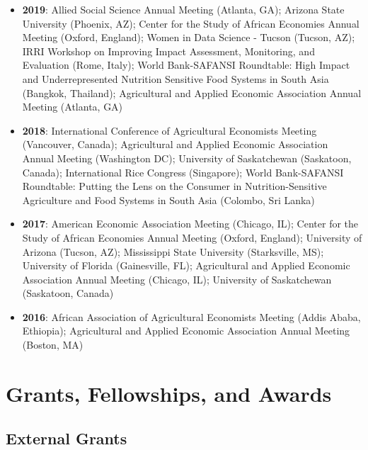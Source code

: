 \documentclass[letterpaper]{article}
\begin{document}
\begin{itemize}
\item \textbf{2019}: Allied Social Science Annual Meeting (Atlanta, GA); Arizona State University (Phoenix, AZ); Center for the Study of African Economies Annual Meeting (Oxford, England); Women in Data Science - Tucson (Tucson, AZ); IRRI Workshop on Improving Impact Assessment, Monitoring, and Evaluation (Rome, Italy); World Bank-SAFANSI Roundtable: High Impact and Underrepresented Nutrition Sensitive Food Systems in South Asia (Bangkok, Thailand); Agricultural and Applied Economic Association Annual Meeting (Atlanta, GA)

\item \textbf{2018}: International Conference of Agricultural Economists Meeting (Vancouver, Canada); Agricultural and Applied Economic Association Annual Meeting (Washington DC); University of Saskatchewan (Saskatoon, Canada); International Rice Congress (Singapore); World Bank-SAFANSI Roundtable: Putting the Lens on the Consumer in Nutrition-Sensitive Agriculture and Food Systems in South Asia (Colombo, Sri Lanka)
	
\item \textbf{2017}: American Economic Association Meeting (Chicago, IL); Center for the Study of African Economies Annual Meeting (Oxford, England); University of Arizona (Tucson, AZ); Mississippi State University (Starksville, MS); University of Florida (Gainesville, FL); Agricultural and Applied Economic Association Annual Meeting (Chicago, IL); University of Saskatchewan (Saskatoon, Canada)

\item \textbf{2016}: African Association of Agricultural Economists Meeting (Addis Ababa, Ethiopia); Agricultural and Applied Economic Association Annual Meeting (Boston, MA) 


\end{itemize}

\section*{Grants, Fellowships, and Awards}

\subsection*{External Grants}
\end{document}
